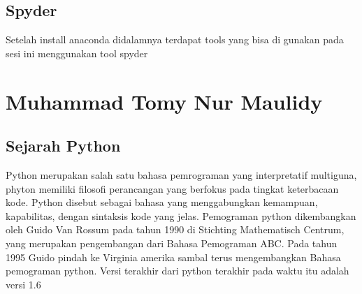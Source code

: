 \subsection{Spyder}
Setelah install anaconda didalamnya terdapat tools yang bisa di gunakan pada sesi ini menggunakan tool spyder

   \section{Muhammad Tomy Nur Maulidy}
\subsection{Sejarah Python}
Python merupakan salah satu bahasa pemrograman yang interpretatif multiguna, phyton memiliki filosofi perancangan yang berfokus pada tingkat keterbacaan kode. Python disebut sebagai bahasa yang menggabungkan kemampuan,  kapabilitas, dengan sintaksis kode yang jelas. Pemograman python dikembangkan oleh Guido Van Rossum pada tahun  1990 di Stichting Mathematisch Centrum, yang merupakan pengembangan dari Bahasa Pemograman ABC. Pada tahun 1995 Guido pindah ke Virginia amerika sambal terus mengembangkan Bahasa pemograman python. Versi terakhir dari python terakhir pada waktu itu adalah versi 1.6
